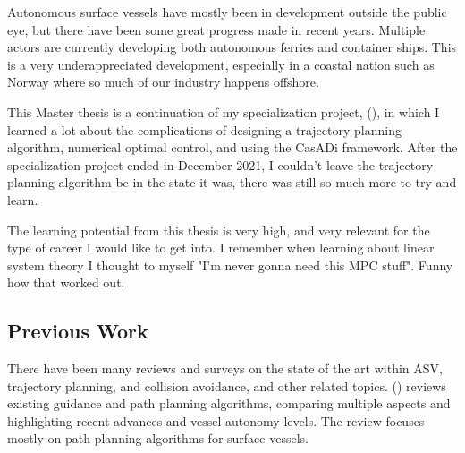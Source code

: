 Autonomous surface vessels have mostly been in development outside the public eye, but there have been some great progress made in recent years. 
Multiple actors are currently developing both autonomous ferries and container ships. This is a very underappreciated development, especially
in a coastal nation such as Norway where so much of our industry happens offshore.

This Master thesis is a continuation of my specialization project, (\cite{Hestvik2021}), in which I learned a lot about the complications
of designing a trajectory planning algorithm, numerical optimal control, and using the CasADi framework. After the specialization project
ended in December 2021, I couldn't leave the trajectory planning algorithm be in the state it was, there was still so much more to try and learn.

The learning potential from this thesis is very high, and very relevant for the type of career I would like to get into.
I remember when learning about linear system theory I thought to myself "I'm never gonna need this MPC stuff". Funny how that worked out.

\subsection{Previous Work}

There have been many reviews and surveys on the state of the art within \gls{ASV}, trajectory planning, and collision avoidance, and other
related topics. (\cite{vagale2021path}) reviews existing guidance and path planning algorithms, comparing multiple aspects and highlighting
recent advances and vessel autonomy levels. The review focuses mostly on path planning algorithms for surface vessels.

